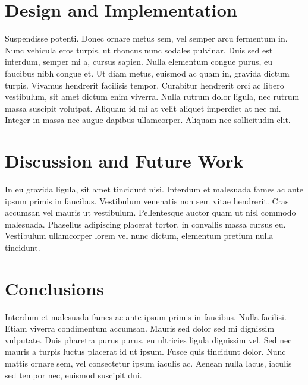 \documentclass{acm_proc_article-sp}
\begin{document}
\section{Design and Implementation}
Suspendisse potenti. Donec ornare metus sem, vel semper arcu fermentum in. Nunc
vehicula eros turpis, ut rhoncus nunc sodales pulvinar. Duis sed est interdum,
semper mi a, cursus sapien. Nulla elementum congue purus, eu faucibus nibh
congue et. Ut diam metus, euismod ac quam in, gravida dictum turpis. Vivamus
hendrerit facilisis tempor. Curabitur hendrerit orci ac libero vestibulum, sit
amet dictum enim viverra. Nulla rutrum dolor ligula, nec rutrum massa suscipit
volutpat. Aliquam id mi at velit aliquet imperdiet at nec mi. Integer in massa
nec augue dapibus ullamcorper. Aliquam nec sollicitudin elit.

\section{Discussion and Future Work}
In eu gravida ligula, sit amet tincidunt nisi. Interdum et malesuada fames ac
ante ipsum primis in faucibus.  Vestibulum venenatis non sem vitae hendrerit.
Cras accumsan vel mauris ut vestibulum. Pellentesque auctor quam ut nisl
commodo malesuada. Phasellus adipiscing placerat tortor, in convallis massa
cursus eu. Vestibulum ullamcorper lorem vel nunc dictum, elementum pretium
nulla tincidunt.

\section{Conclusions}

Interdum et malesuada fames ac ante ipsum primis in faucibus. Nulla facilisi.
Etiam viverra condimentum accumsan. Mauris sed dolor sed mi dignissim
vulputate. Duis \cite{clark:pct} pharetra purus purus, eu ultricies ligula dignissim vel. Sed
nec mauris a turpis luctus placerat id ut ipsum. Fusce quis tincidunt dolor.
Nunc mattis ornare sem, vel consectetur ipsum iaculis ac. Aenean nulla lacus,
iaculis sed tempor nec, euismod suscipit dui.




\end{document}
